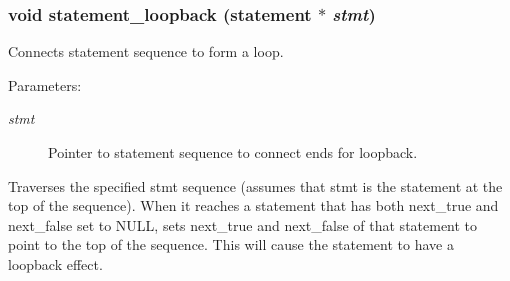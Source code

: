 \subsubsection{\setlength{\rightskip}{0pt plus 5cm}void statement\_\-loopback ({\bf statement} $\ast$ {\em stmt})}\label{statement_8h_a3}


Connects statement sequence to form a loop.

\begin{Desc}
\item[Parameters: ]\par
\begin{description}
\item[{\em 
stmt}]Pointer to statement sequence to connect ends for loopback.\end{description}
\end{Desc}
Traverses the specified stmt sequence (assumes that stmt is the statement at the top of the sequence). When it reaches a statement that has both next\_\-true and next\_\-false set to NULL, sets next\_\-true and next\_\-false of that statement to point to the top of the sequence. This will cause the statement to have a loopback effect. 